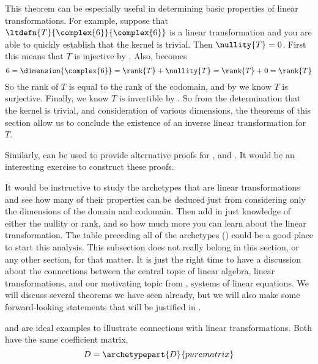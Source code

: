 %
This theorem can be especially useful in determining basic properties of linear transformations.  For example, suppose that $\ltdefn{T}{\complex{6}}{\complex{6}}$ is a linear transformation and you are able to quickly establish that the kernel is trivial.  Then $\nullity{T}=0$.  First this means that $T$ is injective by .  Also,  becomes
%
\begin{equation*}
6=\dimension{\complex{6}}=\rank{T}+\nullity{T}=\rank{T}+0=\rank{T}
\end{equation*}
%
So the rank of $T$ is equal to the rank of the codomain, and by  we know $T$ is surjective.  Finally, we know $T$ is invertible by .  So from the determination that the kernel is trivial, and consideration of various dimensions, the theorems of this section allow us to conclude the existence of an inverse linear transformation for $T$.\par
%
Similarly,  can be used to provide alternative proofs for ,  and .  It would be an interesting exercise to construct these proofs.\par
%
It would be instructive to study the archetypes that are linear transformations and see how many of their properties can be deduced just from considering only the dimensions of the domain and codomain.  Then add in just knowledge of either the nullity or rank, and so how much more you can learn about the linear transformation.  The table preceding all of the archetypes () could be a good place to start this analysis.
%
%
This subsection does not really belong in this section, or any other section, for that matter.  It is just the right time to have a discussion about the connections between the central topic of linear algebra, linear transformations, and our motivating topic from , systems of linear equations.  We will discuss several theorems we have seen already, but we will also make some forward-looking statements that will be justified in .\par
%
 and  are ideal examples to illustrate connections with linear transformations.  Both have the same coefficient matrix,
%
\begin{equation*}
D=\archetypepart{D}{purematrix}
\end{equation*}
